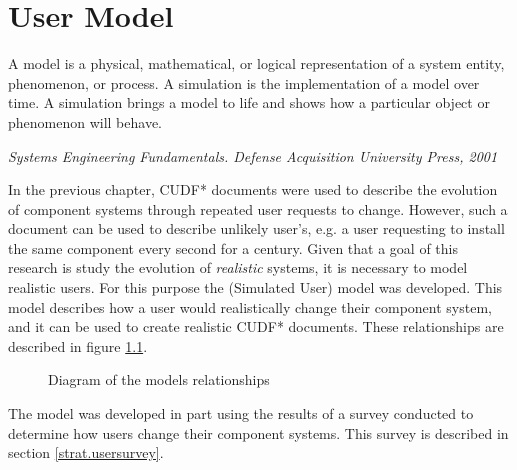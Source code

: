\chapter{User Model}
\label{simulation}
\epigraph{A model is a physical, mathematical, or logical representation of a system entity, phenomenon, or process. 
A simulation is the implementation of a model over time. 
A simulation brings a model to life and shows how a particular object or phenomenon will behave.}
{\textit{Systems Engineering Fundamentals. Defense Acquisition University Press, 2001}}

In the previous chapter, CUDF* documents were used to describe the evolution of component systems through repeated user requests to change.
However, such a document can be used to describe unlikely user's,
e.g. a user requesting to install the same component every second for a century.
Given that a goal of this research is study the evolution of \textit{realistic} systems,
it is necessary to model realistic users. 
For this purpose the \usermodel (Simulated User) model was developed.
This model describes how a user would realistically change their component system,
and it can be used to create realistic CUDF* documents.
These relationships are described in figure \ref{sim.modeldiagram}.

\begin{figure}[htp]
\begin{center}
  \caption{Diagram of the \usermodel models relationships}
  \label{sim.modeldiagram}
\end{center}
\end{figure}

The \usermodel model was developed in part using the results of a survey conducted to determine how users change their component systems.
This survey is described in section \ref{strat.usersurvey}.

